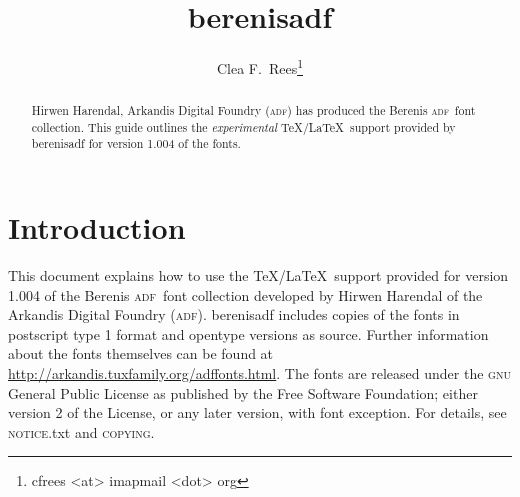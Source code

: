 \documentclass[11pt,british]{article}
\title{berenisadf}
\author{Clea F.\ Rees\footnote{cfrees <at> imapmail <dot> org}}
\date{\dyddiad}
\begin{document}
\maketitle\thispagestyle{empty}
\setlength{\parindent}{0pt}
\setlength{\parskip}{0.5em}
	
	
\newcommand*{\adf}{\textsc{adf}}
\newcommand*{\lpack}[1]{\textsf{#1}}
\newcommand*{\fgroup}[1]{\textsf{#1}}
\newcommand*{\fname}[1]{\textsf{#1}}

\begin{abstract}
	\hspace*{-\parindent}Hirwen Harendal, Arkandis Digital Foundry (\adf) has produced the Berenis \adf\ font collection. This guide outlines the \emph{experimental} \TeX/\LaTeX\ support provided by \lpack{berenisadf} for version 1.004 of the fonts.
\end{abstract}

\tableofcontents

\section{Introduction}

This document explains how to use the \TeX/\LaTeX\ support provided for version 1.004 of the Berenis \adf\ font collection developed by Hirwen Harendal of the Arkandis Digital Foundry (\adf). \lpack{berenisadf} includes copies of the fonts in postscript type 1 format and opentype versions as source. Further  information about the fonts themselves can be found at \url{http://arkandis.tuxfamily.org/adffonts.html}. The fonts are released under the \textsc{gnu} General Public License as published by the Free Software Foundation; either version 2 of the License, or any later version, with font exception. For details, see \textsc{notice}.txt and \textsc{copying}.
\end{document}
